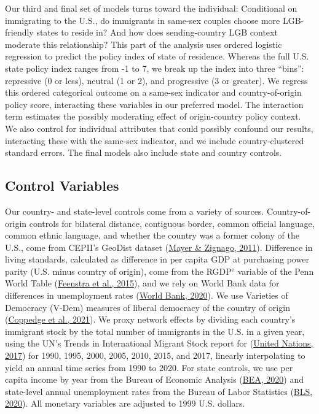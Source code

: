 \documentclass[
  12pt,
]{article}
\begin{document}
Our third and final set of models turns toward the individual: Conditional on immigrating to the U.S., do immigrants in same-sex couples choose more LGB-friendly states to reside in? And how does sending-country LGB context moderate this relationship? This part of the analysis uses ordered logistic regression to predict the policy index of state of residence. Whereas the full U.S. state policy index ranges from -1 to 7, we break up the index into three ``bins'': repressive (0 or less), neutral (1 or 2), and progressive (3 or greater). We regress this ordered categorical outcome on a same-sex indicator and country-of-origin policy score, interacting these variables in our preferred model. The interaction term estimates the possibly moderating effect of origin-country policy context. We also control for individual attributes that could possibly confound our results, interacting these with the same-sex indicator, and we include country-clustered standard errors. The final models also include state and country controls.

\hypertarget{control-variables}{%
\subsection{Control Variables}\label{control-variables}}

Our country- and state-level controls come from a variety of sources. Country-of-origin controls for bilateral distance, contiguous border, common official language, common ethnic language, and whether the country was a former colony of the U.S., come from CEPII's GeoDist dataset (\protect\hyperlink{ref-mayer_2011}{Mayer \& Zignago, 2011}). Difference in living standards, calculated as difference in per capita GDP at purchasing power parity (U.S. minus country of origin), come from the RGDP\(^\text{e}\) variable of the Penn World Table (\protect\hyperlink{ref-feenstra_2015}{Feenstra et al., 2015}), and we rely on World Bank data for differences in unemployment rates (\protect\hyperlink{ref-worldbank_2020}{World Bank, 2020}). We use Varieties of Democracy (V-Dem) measures of liberal democracy of the country of origin (\protect\hyperlink{ref-coppedge_2021}{Coppedge et al., 2021}). We proxy network effects by dividing each country's immigrant stock by the total number of immigrants in the U.S. in a given year, using the UN's Trends in International Migrant Stock report for (\protect\hyperlink{ref-unitednations_2017}{United Nations, 2017}) for 1990, 1995, 2000, 2005, 2010, 2015, and 2017, linearly interpolating to yield an annual time series from 1990 to 2020. For state controls, we use per capita income by year from the Bureau of Economic Analysis (\protect\hyperlink{ref-bea_2020}{BEA, 2020}) and state-level annual unemployment rates from the Bureau of Labor Statistics (\protect\hyperlink{ref-bls_2020}{BLS, 2020}). All monetary variables are adjusted to 1999 U.S. dollars.
\end{document}
